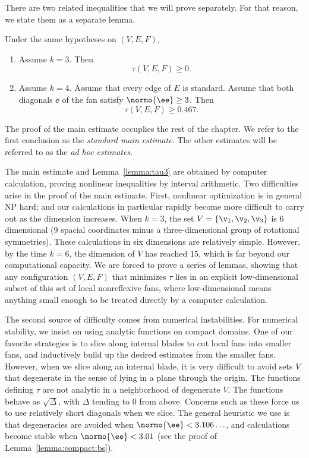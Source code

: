 There are two related inequalities that we will prove separately. For that reason,
we state them as a separate lemma.

\begin{lemma}\label{lemma:tau3}
Under the same hypotheses on $(V,E,F)$, 
\begin{enumerate}
\item Assume $k=3$. Then
\[\tau(V,E,F)\ge 0.\]
\item Assume $k=4$.  Assume that every edge of $E$ is standard.
Assume that both diagonals $\ee$ of the fan satisfy $\normo{\ee}\ge3$.
Then
\[
\tau(V,E,F)\ge 0.467.
\]
\end{enumerate}
\end{lemma}

The proof of the main estimate occuplies the rest of the chapter.
We refer to the first conclusion as the {\it standard main estimate}.  The 
other estimates will be referred to as the {\it ad hoc estimates}. 

The main estimate and Lemma~\ref{lemma:tau3} are obtained by computer
calculation, proving nonlinear inequalities by interval arithmetic.
Two  difficulties
arise in the proof of  the main estimate.  First, nonlinear optimization is
in general NP hard; and our calculations in particular rapidly become
more difficult to carry out as the dimension increases.  When $k=3$,
the set $V=\{\v_1,\v_2,\v_3\}$ is $6$ dimensional ($9$ spacial
coordinates minus a three-dimensional group of rotational symmetries).
These calculations in six dimensions are relatively simple.  However,
by the time $k=6$, the dimension of $V$ has reached $15$, which is far
beyond our computational capacity.  We are forced to prove a series of
lemmas, showing that any configuration $(V,E,F)$ that minimizes $\tau$
lies in an explicit low-dimensional subset of this set of local
nonreflexive fans, where low-dimensional means anything small enough
to be treated directly by a computer calculation.

The second source of difficulty comes from numerical instabilities.
For numerical stability, we insist on using analytic functions on
compact domains.  One of our favorite strategies is to slice along
internal blades to cut local fans into smaller fans, and inductively
build up the desired estimates from the smaller fans.  However, when
we slice along an internal blade, it is very difficult to avoid sets
$V$ that degenerate in the sense of lying in a plane through the
origin.  The functions defining $\tau$ are not analytic in a
neighborhood of degenerate $V$.  The functions behave as
$\sqrt{\Delta}$, with $\Delta$ tending to $0$ from above.  Concerns
such as these force us to use relatively short diagonals when we
slice.  The general heuristic we use is that degeneracies are avoided when
$\normo{\ee}< 3.106\ldots$, and calculations become stable
when $\normo{\ee}<3.01$  (see the proof of
Lemma~\ref{lemma:compact:bs}).

